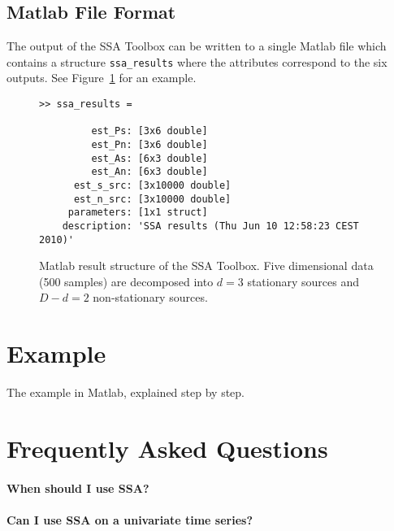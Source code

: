 \documentclass{article}
\newcommand{\1}{\ensuremath{\mathds{1}}}
\newcommand{\0}{\ensuremath{0}}
\begin{document}
\subsection{Matlab File Format}

The output of the SSA Toolbox can be written to a single Matlab file which contains
a structure \texttt{ssa\_results} where the attributes correspond to the six outputs. 
See Figure~\ref{fig:ex_matlab_res} for an example.

\begin{figure}[h]
\centering
\begin{boxedminipage}{12cm}
\begin{verbatim}
>> ssa_results = 

         est_Ps: [3x6 double]
         est_Pn: [3x6 double]
         est_As: [6x3 double]
         est_An: [6x3 double]
      est_s_src: [3x10000 double]
      est_n_src: [3x10000 double]
     parameters: [1x1 struct]
    description: 'SSA results (Thu Jun 10 12:58:23 CEST 2010)'
\end{verbatim}
\end{boxedminipage}
\caption{
Matlab result structure of the SSA Toolbox. Five dimensional data (500 samples) 
are decomposed into $d = 3$ stationary sources and $D-d = 2$ non-stationary sources.
\label{fig:ex_matlab_res}
}
\end{figure}

\section{Example}

The example in Matlab, explained step by step. 

\section{Frequently Asked Questions}

\paragraph{When should I use SSA?}

\paragraph{Can I use SSA on a univariate time series?}
\end{document}
